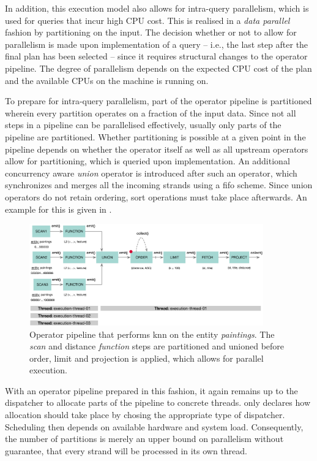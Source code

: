 In addition, this execution model also allows for intra-query parallelism, which is used for queries that incur high CPU cost. This is realised in a \emph{data parallel} fashion by partitioning on the input. The decision whether or not to allow for parallelism is made upon implementation of a query -- i.e., the last step after the final plan has been selected -- since it requires structural changes to the operator pipeline. The degree of parallelism depends on the expected CPU cost of the plan and the available CPUs on the machine \cottontail{} is running on.

To prepare for intra-query parallelism, part of the operator pipeline is partitioned wherein every partition operates on a fraction of the input data. Since not all steps in a pipeline can be parallelised effectively, usually only parts of the pipeline are partitioned. Whether partitioning is possible at a given point in the pipeline depends on whether the operator itself as well as all upstream operators allow for partitioning, which is queried upon implementation. An additional concurrency aware \emph{union} operator is introduced after such an operator, which synchronizes and merges all the incoming strands using a \acrshort{fifo} scheme. Since union operators do not retain ordering, sort operations must take place afterwards. An example for this is given in .

\begin{figure}[bt]
    \centering
    \includegraphics[width=0.9\textwidth]{figures/execution-model-parallel}
    \caption{Operator pipeline that performs \acrshort{knn} on the entity \emph{paintings}. The \emph{scan} and distance \emph{function} steps are partitioned and unioned before order, limit and projection is applied, which allows for parallel execution.}
    \label{figure:cottontail_execution_model_parallel}
\end{figure}

With an operator pipeline prepared in this fashion, it again remains up to the dispatcher to allocate parts of the pipeline to concrete threads. \cottontail{} only declares how allocation should take place by chosing the appropriate type of dispatcher. Scheduling then depends on available hardware and system load. Consequently, the number of partitions is merely an upper bound on parallelism without guarantee, that every strand will be processed in its own thread. 

